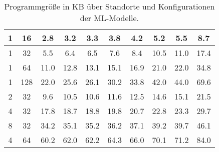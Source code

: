 \begin{table}[h!]
\begin{tabular}{ | c | c | c | c | c | c | c | c | c | c | }
        1 & 16 & 2.8 & 3.2 & 3.3 & 3.8 & 4.2 & 5.2 & 5.5 & 8.7 \\\hline
        1 & 32 & 5.5 & 6.4 & 6.5 & 7.6 & 8.4 & 10.5 & 11.0 & 17.4 \\\hline
        1 & 64 & 11.0 & 12.8 & 13.1 & 15.1 & 16.9 & 21.0 & 22.0 & 34.8 \\\hline
        1 & 128 & 22.0 & 25.6 & 26.1 & 30.2 & 33.8 & 42.0 & 44.0 & 69.6 \\\hline
        2 & 32 & 9.6 & 10.5 & 10.6 & 11.6 & 12.5 & 14.6 & 15.1 & 21.5 \\\hline
        4 & 32 & 17.8 & 18.7 & 18.8 & 19.8 & 20.7 & 22.8 & 23.3 & 29.7 \\\hline
        8 & 32 & 34.2 & 35.1 & 35.2 & 36.2 & 37.1 & 39.2 & 39.7 & 46.1 \\\hline
        4 & 64 & 60.2 & 62.0 & 62.2 & 64.3 & 66.0 & 70.1 & 71.2 & 84.0 \\\hline
    \end{tabular}
    \caption{Programmgröße in KB über Standorte und Konfigurationen der ML-Modelle.}
    \label{tab:predictions_by_loc_size}
\end{table}